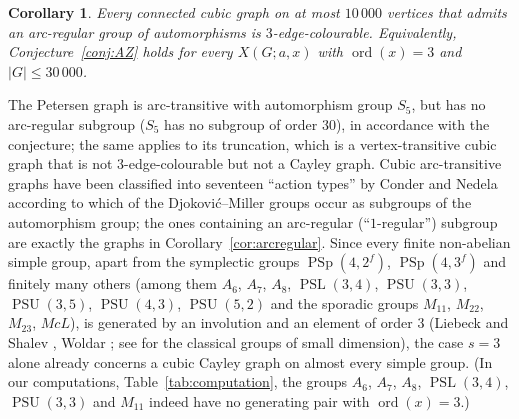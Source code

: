 \documentclass[11pt,a4paper]{article}
\newtheorem{corollary}[theorem]{Corollary}
\theoremstyle{definition}
\theoremstyle{remark}
\newcommand{\ord}{\operatorname{ord}}
\newcommand{\PSL}{\operatorname{PSL}}
\newcommand{\X}[3]{X(#1;#2,#3)}
\begin{document}
\begin{corollary}\label{cor:conder}
Every connected cubic graph on at most $10\,000$ vertices that admits an arc-regular group of automorphisms is $3$-edge-colourable.  Equivalently, Conjecture~\ref{conj:AZ} holds for every $\X{G}{a}{x}$ with $\ord(x)=3$ and $|G|\le 30\,000$.
\end{corollary}

The Petersen graph is arc-transitive with automorphism group $S_5$, but has no arc-regular subgroup ($S_5$ has no subgroup of order $30$), in accordance with the conjecture; the same applies to its truncation, which is a vertex-transitive cubic graph that is not $3$-edge-colourable but not a Cayley graph.  Cubic arc-transitive graphs have been classified into seventeen ``action types'' by Conder and Nedela \cite{ConderNedela09} according to which of the Djokovi\'c--Miller groups \cite{DjokovicMiller80} occur as subgroups of the automorphism group; the ones containing an arc-regular (``$1$-regular'') subgroup are exactly the graphs in Corollary~\ref{cor:arcregular}.  Since every finite non-abelian simple group, apart from the symplectic groups $\operatorname{PSp}(4,2^f)$, $\operatorname{PSp}(4,3^f)$ and finitely many others (among them $A_6$, $A_7$, $A_8$, $\PSL(3,4)$, $\operatorname{PSU}(3,3)$, $\operatorname{PSU}(3,5)$, $\operatorname{PSU}(4,3)$, $\operatorname{PSU}(5,2)$ and the sporadic groups $M_{11}$, $M_{22}$, $M_{23}$, $McL$), is generated by an involution and an element of order $3$ (Liebeck and Shalev \cite{LiebeckShalev96}, Woldar \cite{Woldar89}; see \cite{Pellegrini15} for the classical groups of small dimension), the case $s=3$ alone already concerns a cubic Cayley graph on almost every simple group.  (In our computations, Table~\ref{tab:computation}, the groups $A_6$, $A_7$, $A_8$, $\PSL(3,4)$, $\operatorname{PSU}(3,3)$ and $M_{11}$ indeed have no generating pair with $\ord(x)=3$.)
\end{document}

